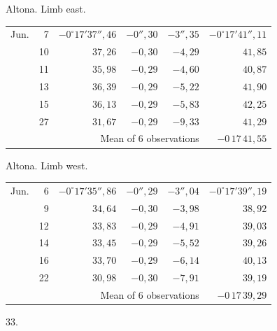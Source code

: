 \noindent\begin{minipage}[t]{.495\textwidth}\centering Altona. Limb east.\par\smallskip
{\scriptsize\setlength{\tabcolsep}{1pt}\renewcommand{\arraystretch}{1.2}\begin{tabular}{lr|r|r|r|r|}
Jun.&7&$-0^\circ17'37''{,}46$&$-0''{,}30$&$-3''{,}35$&$-0^\circ17'41''{,}11$\\
&10&$37{,}26$&$-0{,}30$&$-4{,}29$&$41{,}85$\\
&11&$35{,}98$&$-0{,}29$&$-4{,}60$&$40{,}87$\\
&13&$36{,}39$&$-0{,}29$&$-5{,}22$&$41{,}90$\\
&15&$36{,}13$&$-0{,}29$&$-5{,}83$&$42{,}25$\\
&27&$31{,}67$&$-0{,}29$&$-9{,}33$&$41{,}29$\\
\cline{6-6}\multicolumn{5}{r}{Mean of 6 observations}&$-0\,17\,41{,}55$
\end{tabular}}\end{minipage}\hfill\begin{minipage}[t]{.495\textwidth}\centering Altona. Limb west.\par\smallskip
{\scriptsize\setlength{\tabcolsep}{1pt}\renewcommand{\arraystretch}{1.2}\begin{tabular}{lr|r|r|r|r}
Jun.&6&$-0^\circ17'35''{,}86$&$-0''{,}29$&$-3''{,}04$&$-0^\circ17'39''{,}19$\\
&9&$34{,}64$&$-0{,}30$&$-3{,}98$&$38{,}92$\\
&12&$33{,}83$&$-0{,}29$&$-4{,}91$&$39{,}03$\\
&14&$33{,}45$&$-0{,}29$&$-5{,}52$&$39{,}26$\\
&16&$33{,}70$&$-0{,}29$&$-6{,}14$&$40{,}13$\\
&22&$30{,}98$&$-0{,}30$&$-7{,}91$&$39{,}19$\\
\cline{6-6}\multicolumn{5}{r}{Mean of 6 observations}&$-0\,17\,39{,}29$
\end{tabular}}\end{minipage}
\par\vspace{4mm}
\begin{center}33.\end{center}

